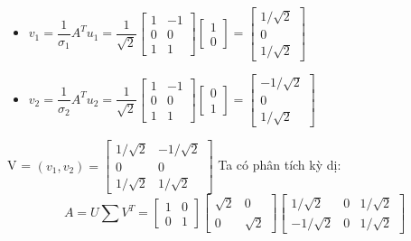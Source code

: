 \documentclass{article}
\begin{document}
\begin{itemize} 
    \item \(
        v_1 = \dfrac{1}{ \sigma_1} A^Tu_1 = \dfrac{1}{ \sqrt2} 
        \begin{bmatrix}
            1 & -1 \\ 0 & 0 \\ 1 & 1
        \end{bmatrix}
        \begin{bmatrix}
            1 \\ 0
        \end{bmatrix}
        = \begin{bmatrix}
            1/ \sqrt2 \\ 0 \\ 1/ \sqrt2
        \end{bmatrix}
    \)
    \item \(
        v_2 = \dfrac{1}{ \sigma_2} A^Tu_2 = \dfrac{1}{ \sqrt2} 
        \begin{bmatrix}
            1 & -1 \\ 0 & 0 \\ 1 & 1
        \end{bmatrix}
        \begin{bmatrix}
            0 \\ 1
        \end{bmatrix}
        = \begin{bmatrix}
            -1/ \sqrt2 \\ 0 \\ 1/ \sqrt2
        \end{bmatrix}
    \)
\end{itemize}
V = \( (v_1, v_2)  = 
\begin{bmatrix}
    1/ \sqrt2 & -1/ \sqrt2 \\ 0 & 0 \\ 1/ \sqrt2 &  1/ \sqrt2
\end{bmatrix} \)
\newline Ta có phân tích kỳ dị:
\[ 
    A = U \sum V^T =
    \begin{bmatrix}
        1 & 0 \\ 0 & 1
    \end{bmatrix} 
    \begin{bmatrix}
        \sqrt2 & 0 \\ 0 & \sqrt2
    \end{bmatrix}    
    \begin{bmatrix}
        1/ \sqrt2 & 0 & 1/ \sqrt2 \\ -1/ \sqrt2 & 0 & 1/ \sqrt2
    \end{bmatrix} 
\]
\end{document}
